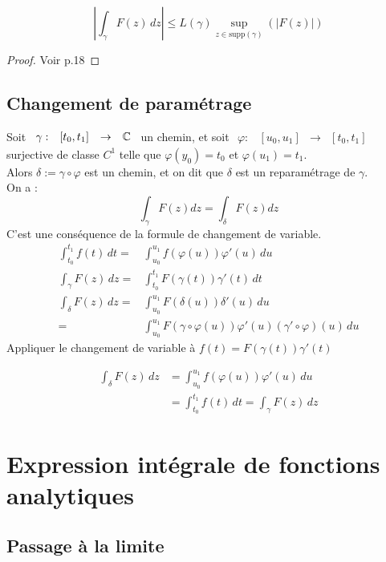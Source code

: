 \documentclass[]{report}
\begin{document}
\begin{lm}
    $$\left|\int_{\gamma} F(z) \,dz\right|\le L(\gamma)\underset{z\in\text{supp}(\gamma)}{\sup}(|F(z)|)$$
\end{lm}

\begin{proof}
    Voir p.18
\end{proof}

\subsection{Changement de paramétrage}

Soit $\begin{array}{ccccc}
\gamma : & [t_0,t_1] & \to & \mathbb{C}
\end{array}$ un chemin, et soit $\begin{array}{ccccc}
\varphi : & [u_0,u_1] & \to & [t_0,t_1]
\end{array}$ surjective de classe $C^1$ telle que $\varphi(y_0)=t_0$ et $\varphi(u_1)=t_1$. \\
Alors $\delta:=\gamma\circ\varphi$ est un chemin, et on dit que $\delta$ est un reparamétrage de $\gamma$.\\
On a : $$\int_\gamma F(z)dz=\int_\delta F(z)dz$$
C'est une conséquence de la formule de changement de variable.
\begin{align*}
\int_{t_0}^{t_1} f(t) \,dt = & \int_{u_0}^{u_1} f(\varphi(u))\varphi'(u)\,du\\
\int_\gamma F(z)\,dz= & \int_{t_0}^{t_1} F(\gamma(t))\gamma'(t)\,dt \\
\int_{\delta} F(z) \,dz=& \int_{u_0}^{u_1} F(\delta(u))\delta'(u)\,du\\
=& \int_{u_0}^{u_1} F(\gamma\circ\varphi(u))\varphi'(u)(\gamma'\circ\varphi)(u)\,du
\end{align*}
Appliquer le changement de variable à $f(t)=F(\gamma(t))\gamma'(t)$

\begin{align*}
     \int_{\delta} F(z)\,dz & = \int_{u_0}^{u_1} f(\varphi(u))\varphi'(u)\,du\\
    & =\int_{t_0}^{t_1}f(t)\,dt=\int_\gamma F(z)\,dz
\end{align*}

\section{Expression intégrale de fonctions analytiques}

\subsection{Passage à la limite}
\end{document}
